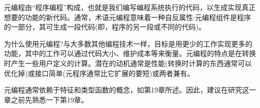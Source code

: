 元编程由“程序编程”构成，也就是我们编写编程系统执行的代码，以生成实现真正想要的功能的新代码。通常，术语元编程意味着一种自反属性:元编程组件是程序的一部分，其可生成一段代码(即，程序的另一段或不同的代码)。

为什么使用元编程?与大多数其他编程技术一样，目标是用更少的工作实现更多的功能，其中的工作可以通过代码大小、维护成本等来衡量。元编程的特点是在转换时产生一些用户定义的计算。潜在的动机通常是性能(转换时计算的东西通常可以优化掉)或接口简单(元程序通常比它扩展的要短)或两者兼有。

元编程通常依赖于特征和类型函数的概念，如第19章所述。因此，建议在研究这一章之前先熟悉一下第19章。